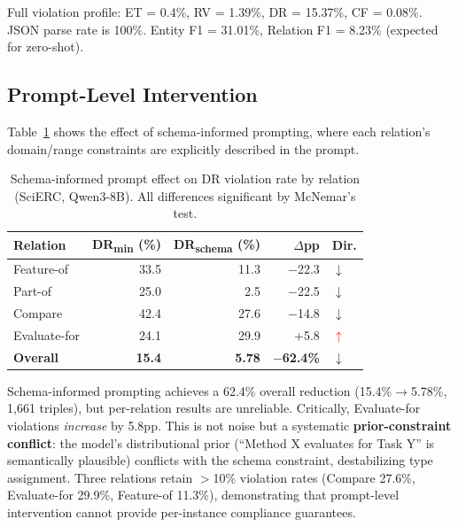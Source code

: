 \documentclass[11pt,a4paper]{article}
\begin{document}
Full violation profile: ET = 0.4\%, RV = 1.39\%, DR = 15.37\%, CF = 0.08\%. JSON parse rate is 100\%. Entity F1 = 31.01\%, Relation F1 = 8.23\% (expected for zero-shot).

\subsection{Prompt-Level Intervention}
\label{sec:prompt-intervention}

Table~\ref{tab:schema-prompt-effect} shows the effect of schema-informed prompting, where each relation's domain/range constraints are explicitly described in the prompt.

\begin{table}[t]
\centering
\small
\caption{Schema-informed prompt effect on DR violation rate by relation (SciERC, Qwen3-8B). All differences significant by McNemar's test.}
\label{tab:schema-prompt-effect}
\begin{tabular}{lrrrl}
\toprule
\textbf{Relation} & \textbf{DR\textsubscript{min} (\%)} & \textbf{DR\textsubscript{schema} (\%)} & \textbf{$\Delta$pp} & \textbf{Dir.} \\
\midrule
Feature-of & 33.5 & 11.3 & $-$22.3 & $\downarrow$ \\
Part-of & 25.0 & 2.5 & $-$22.5 & $\downarrow$ \\
Compare & 42.4 & 27.6 & $-$14.8 & $\downarrow$ \\
Evaluate-for & 24.1 & 29.9 & +5.8 & \textcolor{red}{$\uparrow$} \\
\midrule
\textbf{Overall} & \textbf{15.4} & \textbf{5.78} & \textbf{$-$62.4\%} & $\downarrow$ \\
\bottomrule
\end{tabular}
\end{table}

Schema-informed prompting achieves a 62.4\% overall reduction (15.4\%$\to$5.78\%, 1,661 triples), but per-relation results are unreliable. Critically, Evaluate-for violations \emph{increase} by 5.8pp. This is not noise but a systematic \textbf{prior-constraint conflict}: the model's distributional prior (``Method X evaluates for Task Y'' is semantically plausible) conflicts with the schema constraint, destabilizing type assignment. Three relations retain $>$10\% violation rates (Compare 27.6\%, Evaluate-for 29.9\%, Feature-of 11.3\%), demonstrating that prompt-level intervention cannot provide per-instance compliance guarantees.
\end{document}

